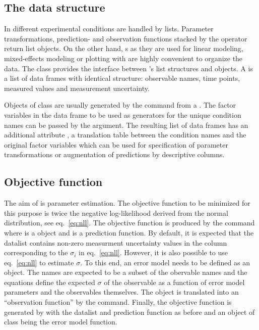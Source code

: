 \documentclass[article]{jss}
\begin{document}
\subsection{The data structure}

In  different experimental conditions are handled by lists. Parameter transformations, prediction- and observation functions stacked by the  operator return list objects. On the other hand, s as they are used for linear modeling, mixed-effects modeling or plotting with  are highly convenient to organize the data.
The class  provides the interface between 's list structures and  objects.
A  is a list of data frames with identical structure: observable names, time points, measured values and measurement uncertainty.

Objects of class  are usually generated by the  command from a . The factor variables in the data frame to be used as generators for the unique condition names can be passed by the  argument. The resulting list of data frames has an additional attribute , a translation table between the condition names and the original factor variables which can be used for specification of parameter transformations or augmentation of predictions by descriptive columns.


\subsection{Objective function}


The aim of  is parameter estimation. The objective function to be minimized for this purpose is twice the negative log-likelihood derived from the normal distribution, see eq.~\eqref{eq:nll}. The objective function is produced by the command  where  is a  object and  is a prediction function. By default, it is expected that the datalist contains non-zero measurment uncertainty values in the  column corresponding to the $\sigma_i$ in eq.~\eqref{eq:nll}. However, it is also possible to use  eq.~\eqref{eq:nll} to estimate $\sigma$. To this end, an error model needs to be defined as an  object. The names are expected to be a subset of the obervable names and the equations define the expected $\sigma$ of the observable as a function of error model parameters and the observables themselves. The  object is translated into an ``observation function'' by the  command. Finally, the objective function is generated by  with the datalist and prediction function as before and an object  of class  being the error model function.
\end{document}
